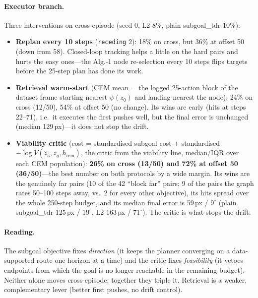 \documentclass[11pt]{article}
\newcommand{\z}{z}
\newcommand{\psiT}{\psi}
\begin{document}
\paragraph{Executor branch.} Three interventions on cross-episode
(seed 0, L2 8\%, plain subgoal\_tdr 10\%):
\begin{itemize}[nosep]
  \item \textbf{Replan every 10 steps} (\texttt{receding} 2): 18\% on cross, but 36\% at
        offset 50 (down from 58). Closed-loop tracking helps a little on the hard pairs and
        hurts the easy ones---the Alg.-1 node re-selection every 10 steps flips targets
        before the 25-step plan has done its work.
  \item \textbf{Retrieval warm-start} (CEM mean = the logged 25-action block of the dataset
        frame starting nearest $\psiT(\z_0)$ and landing nearest the node): 24\% on cross
        (12/50), 54\% at offset 50 (no change). Its wins are early (hits at steps 22--71),
        i.e.\ it executes the first pushes well, but the final error is unchanged (median
        129\,px)---it does not stop the drift.
  \item \textbf{Viability critic} (cost = standardised subgoal cost $+$ standardised
        $-\log V(\hat\z_5, \z_g, h_{\mathrm{rem}})$, the critic from the viability line,
        median/IQR over each CEM population): \textbf{26\% on cross (13/50) and 72\% at offset
        50 (36/50)}---the best number on both protocols by a wide margin. Its wins are the
        genuinely far pairs (10 of the 42 ``block far'' pairs; 9 of the pairs the graph rates
        50--100 steps away, vs.\ 2 for every other objective), its hits spread over the whole
        250-step budget, and its median final error is 59\,px / $9^\circ$ (plain subgoal\_tdr
        125\,px / $19^\circ$, L2 163\,px / $71^\circ$). The critic is what stops the drift.
\end{itemize}

\paragraph{Reading.} The subgoal objective fixes \emph{direction} (it keeps the planner
converging on a data-supported route one horizon at a time) and the critic fixes
\emph{feasibility} (it vetoes endpoints from which the goal is no longer reachable in the
remaining budget). Neither alone moves cross-episode; together they triple it. Retrieval is
a weaker, complementary lever (better first pushes, no drift control).
\end{document}
